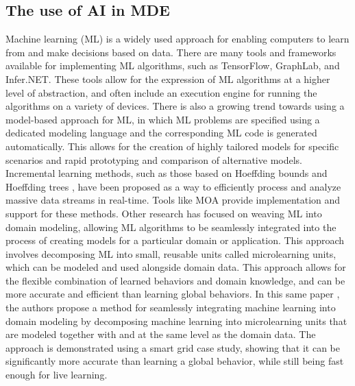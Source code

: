 \subsection{The use of AI in MDE}
Machine learning (ML) is a widely used approach for enabling computers to learn from and make decisions based on data. There are many tools and frameworks available for implementing ML algorithms, such as TensorFlow, GraphLab, and Infer.NET. These tools allow for the expression of ML algorithms at a higher level of abstraction, and often include an execution engine for running the algorithms on a variety of devices.
There is also a growing trend towards using a model-based approach for ML, in which ML problems are specified using a dedicated modeling language and the corresponding ML code is generated automatically. This allows for the creation of highly tailored models for specific scenarios and rapid prototyping and comparison of alternative models.
Incremental learning methods, such as those based on Hoeffding bounds and Hoeffding trees \cite{evolutionMDE}, have been proposed as a way to efficiently process and analyze massive data streams in real-time. Tools like MOA provide implementation and support for these methods.
Other research has focused on weaving ML into domain modeling, allowing ML algorithms to be seamlessly integrated into the process of creating models for a particular domain or application. This approach involves decomposing ML into small, reusable units called microlearning units, which can be modeled and used alongside domain data. This approach allows for the flexible combination of learned behaviors and domain knowledge, and can be more accurate and efficient than learning global behaviors. In this same paper \cite{evolutionMDE}, the authors propose a method for seamlessly integrating machine learning into domain modeling by decomposing machine learning into microlearning units that are modeled together with and at the same level as the domain data. The approach is demonstrated using a smart grid case study, showing that it can be significantly more accurate than learning a global behavior, while still being fast enough for live learning.\\


